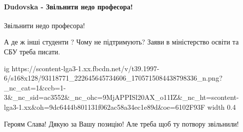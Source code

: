  
 
 
 
 
\paragraph{Dudovska - Звільнити недо професора!}

 
Звільнити недо професора!

 
А де ж інші студенти ? Чому не підтримують? Заяви в міністерство освіти та СБУ треба писати.

 

\ifcmt
  ig https://scontent-lga3-1.xx.fbcdn.net/v/t39.1997-6/s168x128/93118771_222645645734606_1705715084438798336_n.png?_nc_cat=1&ccb=1-3&_nc_sid=ac3552&_nc_ohc=9MjAPPISl20AX_o11IZ&_nc_ht=scontent-lga3-1.xx&oh=9dc6444b801131f062ac58a34ec1e89d&oe=6102F93F
  width 0.4
\fi

 
Героям Слава!
Дякую за Вашу позицію!
Але треба щоб ту потвору звільнили!

 
